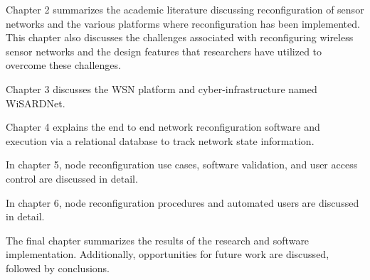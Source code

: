 Chapter 2 summarizes the academic literature discussing reconfiguration of sensor networks and the various platforms where reconfiguration has been implemented. This chapter also discusses the challenges associated with reconfiguring wireless sensor networks and the design features that researchers have utilized to overcome these challenges.


Chapter 3 discusses the WSN platform and cyber-infrastructure named WiSARDNet. 


Chapter 4 explains the end to end network reconfiguration software and execution via a relational database to track network state information.


In chapter 5, node reconfiguration use cases, software validation, and user access control are discussed in detail.


In chapter 6, node reconfiguration procedures and automated users are discussed in detail.


The final chapter summarizes the results of the research and software implementation. Additionally, opportunities for future work are discussed, followed by conclusions.
